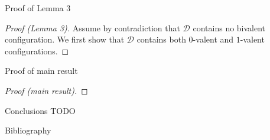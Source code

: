 \documentclass[12pt]{beamer}
\begin{document}
  \begin{frame}{Proof of Lemma 3}
    \begin{proof}[Proof (Lemma 3)]
      Assume by contradiction that \(\mathcal{D}\) contains no bivalent configuration. We first show that \(\mathcal{D}\) contains both \(0\)-valent and \(1\)-valent configurations.
    \end{proof}
  \end{frame}

  \begin{frame}{Proof of main result}
    \begin{proof}[Proof (main result)]
    \end{proof}
  \end{frame}

  \begin{frame}{Conclusions}
    TODO
  \end{frame}

  \begin{frame}{Bibliography}
    
  \end{frame}
\end{document}
